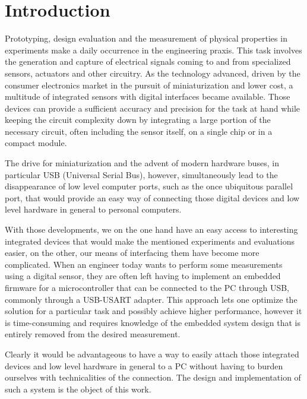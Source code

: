 \chapter{Introduction}

Prototyping, design evaluation and the measurement of physical properties in experiments make a daily occurrence in the engineering praxis. This task involves the generation and capture of electrical signals coming to and from specialized sensors, actuators and other circuitry. As the technology advanced, driven by the consumer electronics market in the pursuit of miniaturization and lower cost, a multitude of integrated sensors with digital interfaces became available. Those devices can provide a sufficient accuracy and precision for the task at hand while keeping the circuit complexity down by integrating a large portion of the necessary circuit, often including the sensor itself, on a single chip or in a compact module.

The drive for miniaturization and the advent of modern hardware buses, in particular USB (Universal Serial Bus), however, simultaneously lead to the disappearance of low level computer ports, such as the once ubiquitous parallel port, that would provide an easy way of connecting those digital devices and low level hardware in general to personal computers.

With those developments, we on the one hand have an easy access to interesting integrated devices that would make the mentioned experiments and evaluations easier, on the other, our means of interfacing them have become more complicated. When an engineer today wants to perform some measurements using a digital sensor, they are often left having to implement an embedded firmware for a microcontroller that can be connected to the PC through USB, commonly through a USB-USART adapter. This approach lets one optimize the solution for a particular task and possibly achieve higher performance, however it is time-consuming and requires knowledge of the embedded system design that is entirely removed from the desired measurement.

Clearly it would be advantageous to have a way to easily attach those integrated devices and low level hardware in general to a PC without having to burden ourselves with technicalities of the connection. The design and implementation of such a system is the object of this work.











